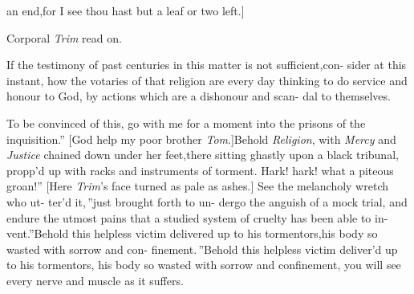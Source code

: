 \documentclass{article}
\begin{document}
\break
an end,\tsk for I see thou hast but a leaf\break
or two left.]

\vspace\parskip
\centerline{Corporal \textit{Trim} read on.}

\lqq If the testimony of past centuries\break
\lqq in this matter is not sufficient,\tsk con-\break
\lqq sider at this instant, how the votaries\break
\lqq of that religion are every day thinking\break
\lqq to do service and honour to God, by\break
\lqq actions which are a dishonour and scan-\break
\lqq dal to themselves.

\lqq To be convinced of this, go with\break
\lqq me for a moment into the prisons of\break
\lqq the inquisition.” [God help my poor\break
brother \textit{Tom}.]\tsk \lqq Behold \textit{Religion},
with
\lqq \textit{Mercy} and \textit{Justice} chained down under\break
\lqq her feet,\tsh there sitting ghastly upon\break
\lqq a black tribunal, propp’d up with racks\break
\lqq and instruments of torment. Hark!\break
\lqq \tsk hark!  what a piteous groan!” [Here\break
\textit{Trim}’s face turned as pale as ashes.]\break
\lqq See the melancholy wretch who ut-\break
\lqq ter’d it,\,” \lqq just brought forth to un-\break
\lqq dergo the anguish of a mock trial, and\break
\lqq endure the utmost pains that a studied\break
\lqq system of cruelty has been able to in-\break
\lqq vent.”\tsk \lqq Behold this helpless victim\break
\lqq delivered up to his tormentors,\tsk his\break
\lqq body so wasted with sorrow and con-\break
\lqq finement.\,”\tsh \lqq Behold this helpless\break
\lqq victim deliver’d up to his tormentors,\break
\lqq \tsk his body so wasted with sorrow and\break
\lqq confinement, you will see every nerve\break
\lqq and muscle as it suffers.
\end{document}
